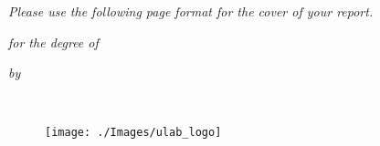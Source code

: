 \thispagestyle{empty}
\begin{center}
\vspace*{\fill}
{\textit{Please use the following page format for the cover of your report.}}
\vspace*{\fill} 
\end{center}
\newpage
\thispagestyle{empty}
\begin{center}
    { \huge {\bfseries {\ReportTitle}} \par}
\vspace{4\baselineskip}
    {\textit{\RoportType for the degree of} \par}
\vspace{4\baselineskip}
    {\large \bf \Degree \par} 
\vspace{\baselineskip}
    {\textit{by} \par}
\vspace{\baselineskip}
    {{\large {\bf \firstAuthor \\ \firstAuthorID}} \par}
\vspace{4\baselineskip}
    {\begin{figure}[!h] 
	\centering
	\texttt{[image: ./Images/ulab\_logo]} 
     \end{figure}
    }
\vspace{1.5\baselineskip}
    {\bf \MakeUppercase{\Department} \par}
\vspace*{1ex}
    {\bf \MakeUppercase{\University} \par}
\vspace*{5ex}
    {\bf \MakeUppercase{\reportSubmissionTerm} \par}    
    
 \end{center}
 
 